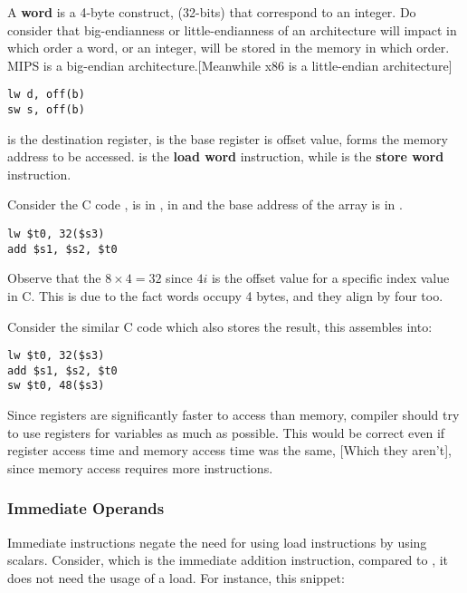 \documentclass[11pt,a4paper,twocolumn]{book}
\begin{document}
A \textbf{word} is a 4-byte construct, (32-bits) that correspond to an integer. Do consider that big-endianness or little-endianness of an architecture will impact in which order a word, or an integer, will be stored in the memory in which order.\\

MIPS is a big-endian architecture.[Meanwhile x86 is a little-endian architecture] \\

\begin{lstlisting}
lw d, off(b)
sw s, off(b)
\end{lstlisting}

 is the destination register,  is the base register  is offset  value,  forms the memory address to be accessed.  is the \textbf{load word} instruction, while  is the \textbf{store word} instruction.

Consider the C code ,  is in ,  in  and the base address of the  array is in .

\begin{lstlisting}
lw $t0, 32($s3)
add $s1, $s2, $t0
\end{lstlisting}

Observe that the $8 \times 4 = 32$ since $4i$ is the offset value for a specific index value in C. This is due to the fact words occupy 4 bytes, and they align by four too.

Consider the similar C code  which also stores the result, this assembles into:

\begin{lstlisting}
lw $t0, 32($s3)
add $s1, $s2, $t0
sw $t0, 48($s3)
\end{lstlisting}

\missed \missed \missed

Since registers are significantly faster to access than memory, compiler should try to use registers for variables as much as possible. This would be correct even if register access time and memory access time was the same, [Which they aren't], since memory access requires more instructions.

\subsubsection{Immediate Operands}

Immediate instructions negate the need for using load instructions by using scalars. Consider,  which is the immediate addition instruction, compared to , it does not need the usage of a load. For instance, this snippet:
\end{document}
